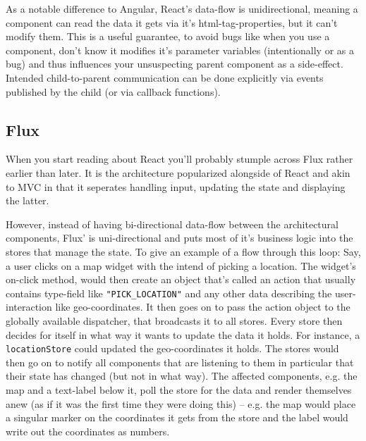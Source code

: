 As a notable difference to Angular, React's data-flow is unidirectional, meaning a component can read the data it gets via it's html-tag-properties, but it can't modify them. This is a useful guarantee, to avoid bugs like when you use a component, don't know it modifies it's parameter variables (intentionally or as a bug) and thus influences your unsuspecting parent component as a side-effect. Intended child-to-parent communication can be done explicitly via events published by the child (or via callback functions). 

\subsection{Flux}\label{ref:flux}

When you start reading about React you'll probably stumple across Flux rather earlier than later. It is the architecture popularized alongside of React and akin to MVC in that it seperates handling input, updating the state and displaying the latter.

However, instead of having bi-directional data-flow between the architectural components, Flux' is uni-directional and puts most of it's business logic into the stores that manage the state. To give an example of a flow through this loop: Say, a user clicks on a map widget with the intend of picking a location. The widget's on-click method, would then create an object that's called an action that usually contains type-field like \texttt{"PICK\_LOCATION"} and any other data describing the
user-interaction like geo-coordinates. It then goes on to pass the action object to the globally available dispatcher, that broadcasts it to all stores. Every store then decides for itself in what way it wants to update the data it holds. For instance, a \texttt{locationStore} could updated the geo-coordinates it holds. The stores would then go on to notify all components that are listening to them in particular that their state has changed (but not in what way). The affected
components, e.g. the map and a text-label below it, poll the store for the data and render themselves anew (as if it was the first time they were doing this) -- e.g. the map would place a singular marker on the coordinates it gets from the store and the label would write out the coordinates as numbers.

